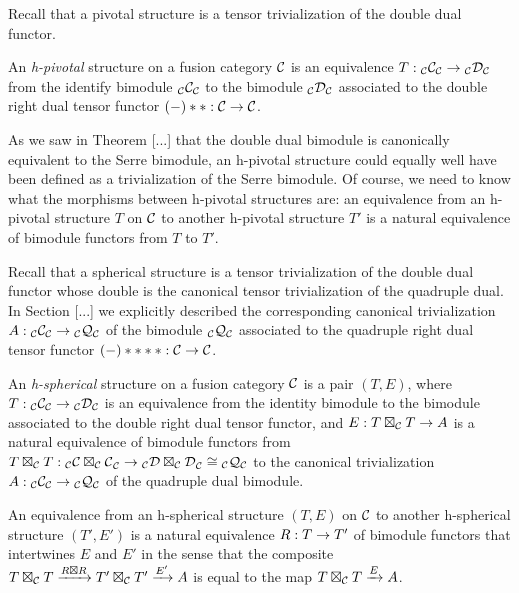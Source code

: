 \documentclass{amsart}
\begin{document}
Recall that a pivotal structure is a tensor trivialization of the double dual functor.

\begin{definition}
An \emph{h-pivotal} structure on a fusion category $\mathcal C$ is an equivalence $T: {}_{\mathcal C} {\mathcal C}_{\mathcal C} \rightarrow {}_{\mathcal C} {\mathcal D}_{\mathcal C}$ from the identify bimodule ${}_{\mathcal C} {\mathcal C}_{\mathcal C}$ to the bimodule ${}_{\mathcal C} {\mathcal D}_{\mathcal C}$ associated to the double right dual tensor functor $(-)**: \mathcal C \rightarrow \mathcal C$.  
\end{definition}

\nid As we saw in Theorem [...] that the double dual bimodule is canonically equivalent to the Serre bimodule, an h-pivotal structure could equally well have been defined as a trivialization of the Serre bimodule.  Of course, we need to know what the morphisms between h-pivotal structures are: an equivalence from an h-pivotal structure $T$ on $\mathcal C$ to another h-pivotal structure $T'$ is a natural equivalence of bimodule functors from $T$ to $T'$.

Recall that a spherical structure is a tensor trivialization of the double dual functor whose double is the canonical tensor trivialization of the quadruple dual.  In Section [...] we explicitly described the corresponding canonical trivialization $A : {}_{\mathcal C} {\mathcal C}_{\mathcal C} \rightarrow {}_{\mathcal C} {\mathcal Q}_{\mathcal C}$ of the bimodule ${}_{\mathcal C} {\mathcal Q}_{\mathcal C}$ associated to the quadruple right dual tensor functor $(-)****: \mathcal C \rightarrow \mathcal C$. 

\begin{definition}
An \emph{h-spherical} structure on a fusion category $\mathcal C$ is a pair $(T,E)$, where $T: {}_{\mathcal C} {\mathcal C}_{\mathcal C} \rightarrow {}_{\mathcal C} {\mathcal D}_{\mathcal C}$ is an equivalence from the identity bimodule to the bimodule associated to the double right dual tensor functor, and $E: T \boxtimes_{\mathcal C} T \rightarrow A$ is a natural equivalence of bimodule functors from $T \boxtimes_{\mathcal C} T: {}_{\mathcal C} {\mathcal C \boxtimes_{\mathcal C} \mathcal C}_{\mathcal C} \rightarrow {}_{\mathcal C} {\mathcal D \boxtimes_{\mathcal C} \mathcal D}_{\mathcal C} \cong {}_{\mathcal C} {\mathcal Q}_{\mathcal C}$ to the canonical trivialization $A : {}_{\mathcal C} {\mathcal C}_{\mathcal C} \rightarrow {}_{\mathcal C} {\mathcal Q}_{\mathcal C}$ of the quadruple dual bimodule.
\end{definition}

An equivalence from an h-spherical structure $(T,E)$ on $\mathcal C$ to another h-spherical structure $(T',E')$ is a natural equivalence $R: T \rightarrow T'$ of bimodule functors that intertwines $E$ and $E'$ in the sense that the composite $T \boxtimes_{\mathcal C} T \xrightarrow{R \boxtimes R} T' \boxtimes_{\mathcal C} T' \xrightarrow{E'} A$ is equal to the map $T \boxtimes_{\mathcal C} T \xrightarrow{E} A$.
\end{document}
